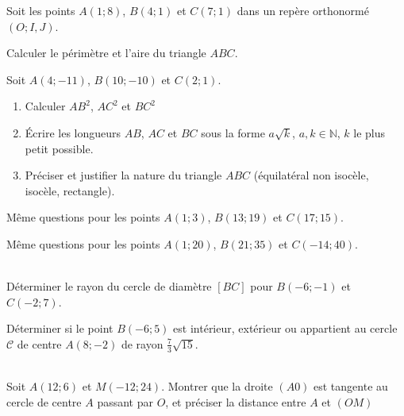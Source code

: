 \documentclass[main.tex]{subfiles}
\begin{document}
\begin{exercise}  
	Soit les points $A(1;8)$, $B(4;1)$ et $C(7;1)$ dans un repère orthonormé $(O;I,J)$.
	
	Calculer le périmètre  et l'aire du triangle $ABC$. 
\end{exercise}    
\begin{exercise}\label{chapter06:exercice:distances:naturetriangle01} \hfill 
	
	Soit $A(4;-11)$, $B(10;-10)$ et $C(2;1)$.
	\begin{enumerate}[label=\alph*),leftmargin=*]
		\item Calculer $AB^2$, $AC^2$ et $BC^2$
		\item Écrire les longueurs  $AB$, $AC$ et $BC$ sous la forme $a\sqrt{k}$, $a,k\in\mathbb{N}$, $k$ le plus petit possible.
		\item Préciser et justifier la nature du triangle $ABC$ (équilatéral non isocèle, isocèle, rectangle).
	\end{enumerate}
\end{exercise}
\begin{exercise}\label{chapter06:exercice:distances:naturetriangle02}  
	Même questions pour les points $A(1;3)$, $B(13;19)$ et $C(17;15)$. 
\end{exercise} 
\begin{exercise}\label{chapter06:exercice:distances:naturetriangle03} 
	Même questions pour les points $A(1;20)$, $B(21;35)$ et $C(-14;40)$.  
\end{exercise}   
\begin{exercise}\label{chapter06:exercice:distances:cercle01} 
	\hfill \\ 
	Déterminer le rayon du cercle de diamètre $[BC]$ pour $B(-6;-1)$ et $C(-2;7)$.
\end{exercise}
\begin{exercise}\label{chapter06:exercice:distances:cercle02}   
	\hfill  
	Déterminer si le point $B(-6;5)$ est intérieur, extérieur ou appartient au cercle $\mathscr{C}$ de centre $A(8;-2)$ de rayon $\tfrac{7}{3}\sqrt{15}$.
\end{exercise}
\begin{exercise}  
	\hfill \\
	Soit $A(12;6)$ et $M(-12;24)$.  
	Montrer que la droite $(A0)$ est tangente au cercle de centre $A$ passant par $O$, et préciser la distance entre $A$ et $(OM)$
\end{exercise} 
\end{document}
